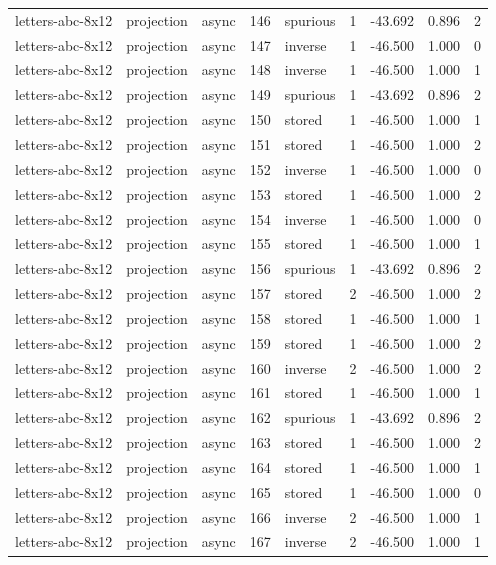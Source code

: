 \begin{tabular}{lllrlrrrr}
letters-abc-8x12 & projection & async & 146 & spurious & 1 & -43.692 & 0.896 & 2 \\
letters-abc-8x12 & projection & async & 147 & inverse & 1 & -46.500 & 1.000 & 0 \\
letters-abc-8x12 & projection & async & 148 & inverse & 1 & -46.500 & 1.000 & 1 \\
letters-abc-8x12 & projection & async & 149 & spurious & 1 & -43.692 & 0.896 & 2 \\
letters-abc-8x12 & projection & async & 150 & stored & 1 & -46.500 & 1.000 & 1 \\
letters-abc-8x12 & projection & async & 151 & stored & 1 & -46.500 & 1.000 & 2 \\
letters-abc-8x12 & projection & async & 152 & inverse & 1 & -46.500 & 1.000 & 0 \\
letters-abc-8x12 & projection & async & 153 & stored & 1 & -46.500 & 1.000 & 2 \\
letters-abc-8x12 & projection & async & 154 & inverse & 1 & -46.500 & 1.000 & 0 \\
letters-abc-8x12 & projection & async & 155 & stored & 1 & -46.500 & 1.000 & 1 \\
letters-abc-8x12 & projection & async & 156 & spurious & 1 & -43.692 & 0.896 & 2 \\
letters-abc-8x12 & projection & async & 157 & stored & 2 & -46.500 & 1.000 & 2 \\
letters-abc-8x12 & projection & async & 158 & stored & 1 & -46.500 & 1.000 & 1 \\
letters-abc-8x12 & projection & async & 159 & stored & 1 & -46.500 & 1.000 & 2 \\
letters-abc-8x12 & projection & async & 160 & inverse & 2 & -46.500 & 1.000 & 2 \\
letters-abc-8x12 & projection & async & 161 & stored & 1 & -46.500 & 1.000 & 1 \\
letters-abc-8x12 & projection & async & 162 & spurious & 1 & -43.692 & 0.896 & 2 \\
letters-abc-8x12 & projection & async & 163 & stored & 1 & -46.500 & 1.000 & 2 \\
letters-abc-8x12 & projection & async & 164 & stored & 1 & -46.500 & 1.000 & 1 \\
letters-abc-8x12 & projection & async & 165 & stored & 1 & -46.500 & 1.000 & 0 \\
letters-abc-8x12 & projection & async & 166 & inverse & 2 & -46.500 & 1.000 & 1 \\
letters-abc-8x12 & projection & async & 167 & inverse & 2 & -46.500 & 1.000 & 1 \\

\end{tabular}
